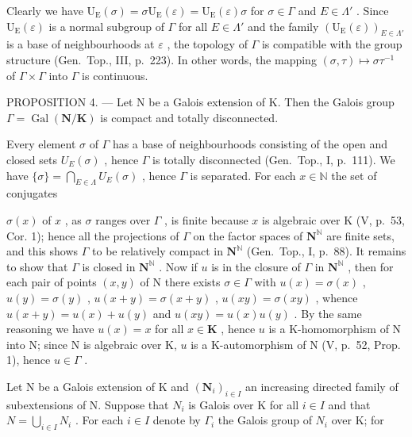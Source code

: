 Clearly we have \(\mathrm{U}_{\mathrm{E}}(\sigma)=\sigma\mathrm{U}_{\mathrm{E}}(\varepsilon)=\mathrm{U}_{\mathrm{E}}(\varepsilon)\sigma\) for \(\sigma\in\Gamma\) and \(E\in\Lambda'\) . Since \(\mathrm{U}_{\mathrm{E}}(\varepsilon)\) is a normal subgroup of \(\Gamma\) for all \(E\in\Lambda'\) and the family \((\mathrm{U}_{\mathrm{E}}(\varepsilon))_{E\in\Lambda'}\) is a base of neighbourhoods at \(\varepsilon\) , the topology of \(\Gamma\) is compatible with the group structure (Gen.~Top., III, p.~223). In other words, the mapping \((\sigma,\tau)\mapsto\sigma\tau^{-1}\) of \(\Gamma\times\Gamma\) into \(\Gamma\) is continuous.

PROPOSITION 4. --- Let N be a Galois extension of K. Then the Galois group \(\Gamma = \operatorname{Gal}(\mathbf{N}/\mathbf{K})\) is compact and totally disconnected.

Every element \(\sigma\) of \(\Gamma\) has a base of neighbourhoods consisting of the open and closed sets \(U_{E}(\sigma)\) , hence \(\Gamma\) is totally disconnected (Gen.~Top., I, p.~111). We have \(\{\sigma\} = \bigcap_{E \in \Lambda} U_{E}(\sigma)\) , hence \(\Gamma\) is separated. For each \(x \in \mathbb{N}\) the set of conjugates

\(\sigma(x)\) of \(x\) , as \(\sigma\) ranges over \(\Gamma\) , is finite because \(x\) is algebraic over K (V, p.~53, Cor. 1); hence all the projections of \(\Gamma\) on the factor spaces of \(\mathbf{N}^{\mathbb{N}}\) are finite sets, and this shows \(\Gamma\) to be relatively compact in \(\mathbf{N}^{\mathbb{N}}\) (Gen.~Top., I, p.~88). It remains to show that \(\Gamma\) is closed in \(\mathbf{N}^{\mathbb{N}}\) . Now if \(u\) is in the closure of \(\Gamma\) in \(\mathbf{N}^{\mathbb{N}}\) , then for each pair of points \((x,y)\) of N there exists \(\sigma \in \Gamma\) with \(u(x) = \sigma(x)\) , \(u(y) = \sigma(y)\) , \(u(x + y) = \sigma(x + y)\) , \(u(xy) = \sigma(xy)\) , whence \(u(x + y) = u(x) + u(y)\) and \(u(xy) = u(x)u(y)\) . By the same reasoning we have \(u(x) = x\) for all \(x \in \mathbf{K}\) , hence \(u\) is a K-homomorphism of N into N; since N is algebraic over K, \(u\) is a K-automorphism of N (V, p.~52, Prop. 1), hence \(u \in \Gamma\) .

Let N be a Galois extension of K and \((\mathbf{N}_{i})_{i\in I}\) an increasing directed family of subextensions of N. Suppose that \(N_{i}\) is Galois over K for all \(i\in I\) and that \(N=\bigcup_{i\in I}N_{i}\) . For each \(i\in I\) denote by \(\Gamma_{i}\) the Galois group of \(N_{i}\) over K; for

